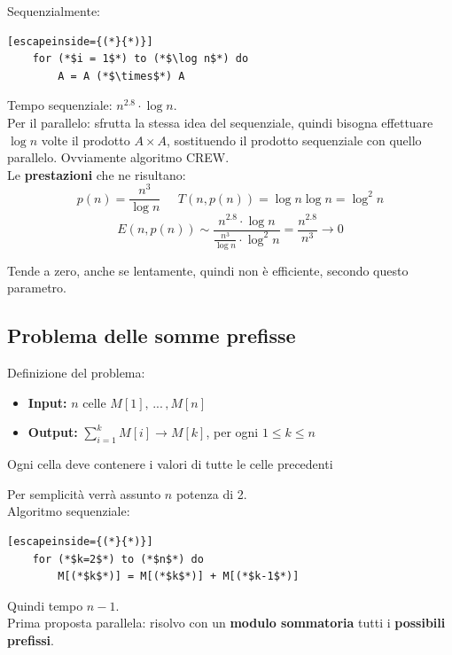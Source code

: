\documentclass[11pt]{article}
\begin{document}
	Sequenzialmente: 
	\begin{lstlisting}[escapeinside={(*}{*)}]
	for (*$i = 1$*) to (*$\log n$*) do
		A = A (*$\times$*) A 
	\end{lstlisting}
	
	Tempo sequenziale: $n^{2.8} \cdot \log n$.\\
	
	Per il parallelo: sfrutta la stessa idea del sequenziale, quindi bisogna effettuare $\log n$ volte il prodotto $A \times A$, sostituendo il prodotto sequenziale con quello parallelo. Ovviamente algoritmo CREW.\\
	
	Le \textbf{prestazioni} che ne risultano: 
	$$ p(n) = \frac{n^3}{\log n} \;\;\;\;\; T(n, p(n)) = \log n \log n = \log^2 n $$
	$$ E (n, p(n)) \sim \frac{n^{2.8} \cdot \log n}{\frac{n^3}{\log n} \cdot \log^2 n} = \frac{n^{2.8}}{n^3} \rightarrow 0 $$
	
	Tende a zero, anche se lentamente, quindi non è efficiente, secondo questo parametro.\\
	
	\newpage

	\subsection{Problema delle somme prefisse}
	
	Definizione del problema:
	\begin{itemize}
		\item \textbf{Input:} $n$ celle $M[1], \, ... \, , M[n]$
		\item \textbf{Output:} $\sum_{i=1}^k M[i] \rightarrow M[k]$, per ogni $1 \leq k \leq n$
	\end{itemize}
	Ogni cella deve contenere i valori di tutte le celle precedenti
	
	Per semplicità verrà assunto $n$ potenza di 2.\\
	
	Algoritmo sequenziale: 
	\begin{lstlisting}[escapeinside={(*}{*)}]
	for (*$k=2$*) to (*$n$*) do
		M[(*$k$*)] = M[(*$k$*)] + M[(*$k-1$*)]
	\end{lstlisting}
	
	Quindi tempo $n-1$.\\
	
	Prima proposta parallela: risolvo con un \textbf{modulo sommatoria} tutti i \textbf{possibili prefissi}.\\
	
\end{document}
